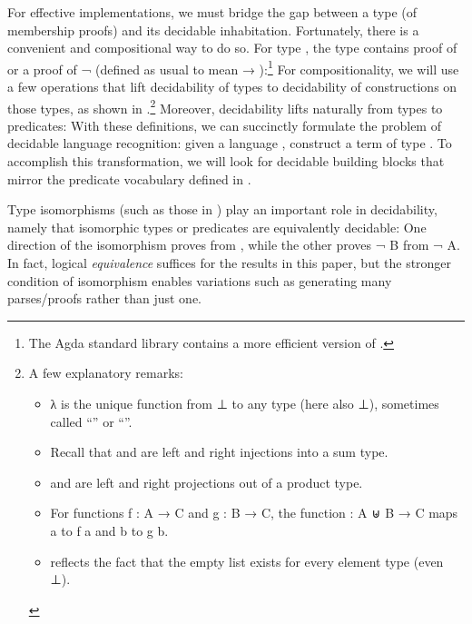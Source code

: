 \documentclass[acmsmall,screen,timestamp]{acmart}  %
\begin{document}
For effective implementations, we must bridge the gap between a type (of membership proofs) and its decidable inhabitation.
Fortunately, there is a convenient and compositional way to do so.
For type , the type { } contains proof of  or a proof of {\AF ¬ } (defined as usual to mean { \AS → }):\footnote{The Agda standard library contains a more efficient version of  .}
For compositionality, we will use a few operations that lift decidability of types to decidability of constructions on those types, as shown in .\footnote{%
A few explanatory remarks:
\begin{itemize}

\item {\AS λ \AS{()}} is the unique function from \AD ⊥ to any type (here also {\AD ⊥}),  sometimes called ``'' or ``''.

\item Recall that  and  are left and right injections into a sum type.

\item {} and  are left and right projections out of a product type.

\item For functions {\AB f \AS : \AB A \AS → \AB C} and {\AB g \AS : \AB B \AS → C}, the function {\AF [ \AB f \AF , \AB g \AF ] \AS : \AB A \AF ⊎ \AB B \AS → \AB C} maps { \AB a} to {\AB f \AB a} and { \AB b} to {\AB g \AB b}.

\item {} reflects the fact that the empty list exists for every element type (even \AF ⊥).
\end{itemize}
\vspace{-2ex}
}
Moreover, decidability lifts naturally from types to predicates:
With these definitions, we can succinctly formulate the problem of decidable language recognition: given a language , construct a term of type { }.
To accomplish this transformation, we will look for decidable building blocks that mirror the predicate vocabulary defined in .

Type isomorphisms (such as those in ) play an important role in decidability, namely that isomorphic types or predicates are equivalently decidable:
One direction of the isomorphism proves  from , while the other proves {\AF ¬ B} from {\AF ¬ A}.
In fact, logical \emph{equivalence} suffices for the results in this paper, but the stronger condition of isomorphism enables variations such as generating many parses/proofs rather than just one.
\end{document}
